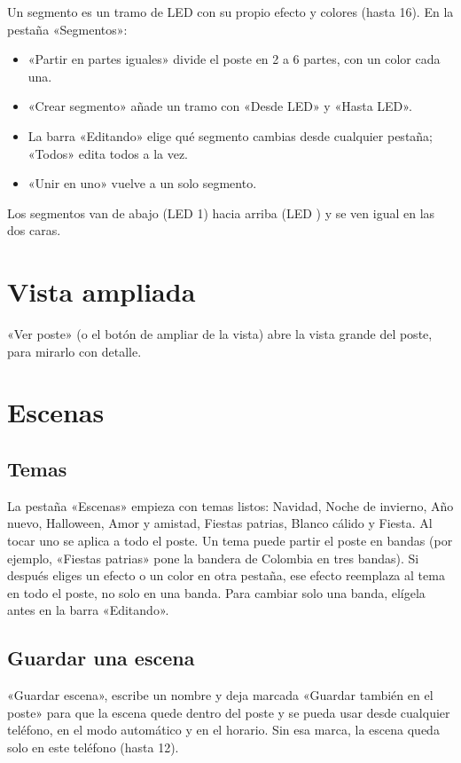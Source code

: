 Un segmento es un tramo de LED con su propio efecto y colores (hasta 16). En la pestaña «Segmentos»:
\begin{itemize}
\item «Partir en partes iguales» divide el poste en 2 a 6 partes, con un color cada una.
\item «Crear segmento» añade un tramo con «Desde LED» y «Hasta LED».
\item La barra «Editando» elige qué segmento cambias desde cualquier pestaña; «Todos» edita todos a la vez.
\item «Unir en uno» vuelve a un solo segmento.
\end{itemize}
Los segmentos van de abajo (LED 1) hacia arriba (LED ) y se ven igual en las dos caras.


\section{Vista ampliada}

«Ver poste» (o el botón de ampliar de la vista) abre la vista grande del poste, para mirarlo con detalle.


\section{Escenas}

\subsection{Temas}
La pestaña «Escenas» empieza con temas listos: Navidad, Noche de invierno, Año nuevo, Halloween, Amor y amistad, Fiestas patrias, Blanco cálido y Fiesta. Al tocar uno se aplica a todo el poste. Un tema puede partir el poste en bandas (por ejemplo, «Fiestas patrias» pone la bandera de Colombia en tres bandas). Si después eliges un efecto o un color en otra pestaña, ese efecto reemplaza al tema en todo el poste, no solo en una banda. Para cambiar solo una banda, elígela antes en la barra «Editando».


\subsection{Guardar una escena}
«Guardar escena», escribe un nombre y deja marcada «Guardar también en el poste» para que la escena quede dentro del poste y se pueda usar desde cualquier teléfono, en el modo automático y en el horario. Sin esa marca, la escena queda solo en este teléfono (hasta 12).

